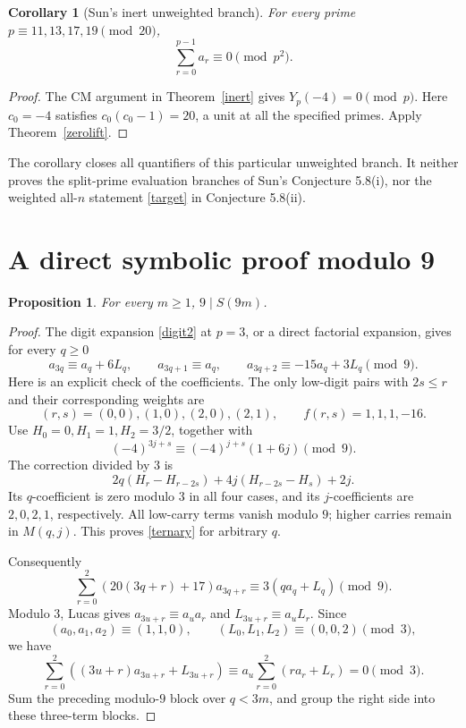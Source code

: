 \documentclass[11pt,a4paper]{article}
\newtheorem{corollary}[theorem]{Corollary}
\newtheorem{proposition}[theorem]{Proposition}
\theoremstyle{remark}\newtheorem{remark}[theorem]{Remark}
\begin{document}
\begin{corollary}[Sun's inert unweighted branch]\label{unweighted}
For every prime \(p\equiv11,13,17,19\pmod {20}\),
\[
                 \sum_{r=0}^{p-1}a_r\equiv0\pmod {p^2}.
\]
\end{corollary}
\begin{proof}
The CM argument in Theorem~\ref{inert} gives \(Y_p(-4)=0\pmod p\).
Here \(c_0=-4\) satisfies \(c_0(c_0-1)=20\), a unit at all the
specified primes. Apply Theorem~\ref{zerolift}.
\end{proof}

The corollary closes all quantifiers of this particular unweighted
branch. It neither proves the split-prime evaluation branches of
Sun's Conjecture 5.8(i), nor the weighted all-\(n\) statement
\eqref{target} in Conjecture 5.8(ii).


\section{A direct symbolic proof modulo 9}

\begin{proposition}\label{nine}
For every \(m\ge1\), \(9\mid S(9m)\).
\end{proposition}
\begin{proof}
The digit expansion \eqref{digit2} at \(p=3\), or a direct factorial
expansion, gives for every \(q\ge0\)
\begin{equation}\label{ternary}
 a_{3q}\equiv a_q+6L_q,\qquad
 a_{3q+1}\equiv a_q,\qquad
 a_{3q+2}\equiv-15a_q+3L_q\pmod9.
\end{equation}
Here is an explicit check of the coefficients. The only low-digit
pairs with \(2s\le r\) and their corresponding weights are
\[
 (r,s)=(0,0),(1,0),(2,0),(2,1),\qquad f(r,s)=1,1,1,-16.
\]
Use \(H_0=0,H_1=1,H_2=3/2\), together with
\[
 (-4)^{3j+s}\equiv(-4)^{j+s}(1+6j)\pmod9.
\]
The correction divided by \(3\) is
\[
 2q(H_r-H_{r-2s})+4j(H_{r-2s}-H_s)+2j .
\]
Its \(q\)-coefficient is zero modulo \(3\) in all four cases, and its
\(j\)-coefficients are \(2,0,2,1\), respectively.
All low-carry terms vanish modulo \(9\); higher carries remain in
\(M(q,j)\). This proves \eqref{ternary} for arbitrary \(q\).

Consequently
\[
 \sum_{r=0}^2(20(3q+r)+17)a_{3q+r}
 \equiv3(q a_q+L_q)\pmod9.
\]
Modulo \(3\), Lucas gives \(a_{3u+r}\equiv a_u a_r\) and
\(L_{3u+r}\equiv a_u L_r\). Since
\[
 (a_0,a_1,a_2)\equiv(1,1,0),\qquad
 (L_0,L_1,L_2)\equiv(0,0,2)\pmod3,
\]
we have
\[
 \sum_{r=0}^2((3u+r)a_{3u+r}+L_{3u+r})
 \equiv a_u\sum_{r=0}^2(r a_r+L_r)=0\pmod3.
\]
Sum the preceding modulo-\(9\) block over \(q<3m\), and group the
right side into these three-term blocks.
\end{proof}
\end{document}
